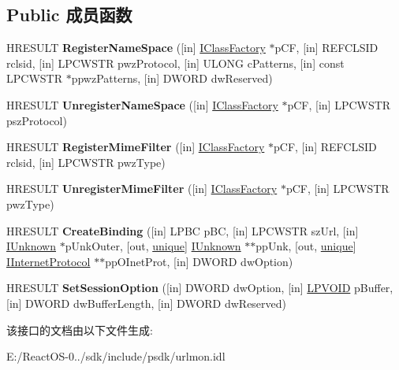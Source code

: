 \subsection*{Public 成员函数}
\begin{DoxyCompactItemize}
\item 
\mbox{\label{interface_i_internet_session_a018913649c4117163cc53574ec33823a}} 
H\+R\+E\+S\+U\+LT {\bfseries Register\+Name\+Space} (\mbox{[}in\mbox{]} \hyperlink{interface_i_class_factory}{I\+Class\+Factory} $\ast$p\+CF, \mbox{[}in\mbox{]} R\+E\+F\+C\+L\+S\+ID rclsid, \mbox{[}in\mbox{]} L\+P\+C\+W\+S\+TR pwz\+Protocol, \mbox{[}in\mbox{]} U\+L\+O\+NG c\+Patterns, \mbox{[}in\mbox{]} const L\+P\+C\+W\+S\+TR $\ast$ppwz\+Patterns, \mbox{[}in\mbox{]} D\+W\+O\+RD dw\+Reserved)
\item 
\mbox{\label{interface_i_internet_session_ae9c66004ed0409262e2bfe1a584aa81d}} 
H\+R\+E\+S\+U\+LT {\bfseries Unregister\+Name\+Space} (\mbox{[}in\mbox{]} \hyperlink{interface_i_class_factory}{I\+Class\+Factory} $\ast$p\+CF, \mbox{[}in\mbox{]} L\+P\+C\+W\+S\+TR psz\+Protocol)
\item 
\mbox{\label{interface_i_internet_session_a5b1001db33b4436b541dc44a715c51a2}} 
H\+R\+E\+S\+U\+LT {\bfseries Register\+Mime\+Filter} (\mbox{[}in\mbox{]} \hyperlink{interface_i_class_factory}{I\+Class\+Factory} $\ast$p\+CF, \mbox{[}in\mbox{]} R\+E\+F\+C\+L\+S\+ID rclsid, \mbox{[}in\mbox{]} L\+P\+C\+W\+S\+TR pwz\+Type)
\item 
\mbox{\label{interface_i_internet_session_af4fbd962a586b2aee513255fb96c2b97}} 
H\+R\+E\+S\+U\+LT {\bfseries Unregister\+Mime\+Filter} (\mbox{[}in\mbox{]} \hyperlink{interface_i_class_factory}{I\+Class\+Factory} $\ast$p\+CF, \mbox{[}in\mbox{]} L\+P\+C\+W\+S\+TR pwz\+Type)
\item 
\mbox{\label{interface_i_internet_session_a5ea56470e174f7b22803901602ab6fd4}} 
H\+R\+E\+S\+U\+LT {\bfseries Create\+Binding} (\mbox{[}in\mbox{]} L\+P\+BC p\+BC, \mbox{[}in\mbox{]} L\+P\+C\+W\+S\+TR sz\+Url, \mbox{[}in\mbox{]} \hyperlink{interface_i_unknown}{I\+Unknown} $\ast$p\+Unk\+Outer, \mbox{[}out, \hyperlink{interfaceunique}{unique}\mbox{]} \hyperlink{interface_i_unknown}{I\+Unknown} $\ast$$\ast$pp\+Unk, \mbox{[}out, \hyperlink{interfaceunique}{unique}\mbox{]} \hyperlink{interface_i_internet_protocol}{I\+Internet\+Protocol} $\ast$$\ast$pp\+O\+Inet\+Prot, \mbox{[}in\mbox{]} D\+W\+O\+RD dw\+Option)
\item 
\mbox{\label{interface_i_internet_session_a5bdb00b50cee271e3aa4efa12a618b81}} 
H\+R\+E\+S\+U\+LT {\bfseries Set\+Session\+Option} (\mbox{[}in\mbox{]} D\+W\+O\+RD dw\+Option, \mbox{[}in\mbox{]} \hyperlink{interfacevoid}{L\+P\+V\+O\+ID} p\+Buffer, \mbox{[}in\mbox{]} D\+W\+O\+RD dw\+Buffer\+Length, \mbox{[}in\mbox{]} D\+W\+O\+RD dw\+Reserved)
\end{DoxyCompactItemize}


该接口的文档由以下文件生成\+:\begin{DoxyCompactItemize}
\item 
E\+:/\+React\+O\+S-\/0../sdk/include/psdk/urlmon.\+idl\end{DoxyCompactItemize}
